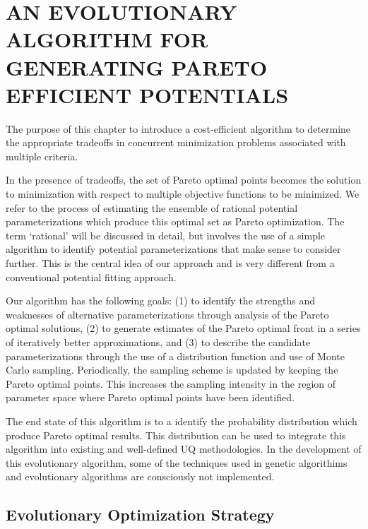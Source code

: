 \chapter{AN EVOLUTIONARY ALGORITHM FOR GENERATING PARETO EFFICIENT POTENTIALS}
\label{ch:methodology}

The purpose of this chapter to introduce a cost-efficient algorithm to determine the appropriate tradeoffs in concurrent minimization problems associated with multiple criteria.

In the presence of tradeoffs, the set of Pareto optimal points becomes the solution to minimization with respect to multiple objective functions to be minimized.  We refer to the process of estimating the ensemble of rational potential parameterizations which produce this optimal set as Pareto optimization.   The term ‘rational’ will be discussed in detail, but involves the use of a simple algorithm to identify potential parameterizations that make sense to consider further. This is the central idea of our approach and is very different from a conventional potential fitting approach.

Our algorithm has the following goals: (1) to identify the strengths and weaknesses of alternative parameterizations through analysis of the Pareto optimal solutions, (2) to generate estimates of the Pareto optimal front in a series of iteratively better approximations, and (3) to describe the candidate parameterizations through the use of a distribution function and use of Monte Carlo sampling.  Periodically, the sampling scheme is updated by keeping the Pareto optimal points.  This increases the sampling intensity in the region of parameter space where Pareto optimal points have been identified.

The end state of this algorithm is to a identify the probability distribution which produce Pareto optimal results.  This distribution can be used to integrate this algorithm into existing and well-defined UQ methodologies.  In the development of this evolutionary algorithm, some of the techniques used in genetic algorithims and evolutionary algorithms are consciously not implemented.

\section{Evolutionary Optimization Strategy}
\label{sec:strategy}


